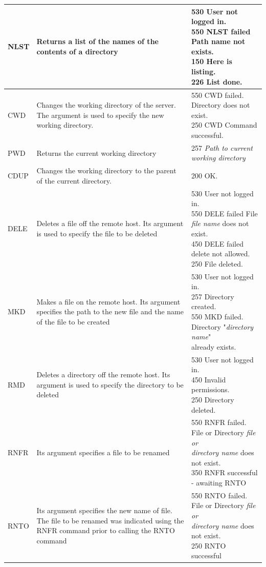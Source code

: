 \documentclass[10pt,twocolumn]{witseiepaper}
\begin{document}
\begin{appendix}
\begin{longtable}{|p{2cm}|p{7cm}|p{7cm}|}
	\hline 
NLST & Returns a list of the names of the contents of a directory & \makecell[l]{530 User not logged in. \\550 NLST failed Path name not exists. \\150 Here is listing. \\226 List done.} \\ 
	\hline 
CWD	& Changes the working directory of the server. The argument is used to specify the new working directory.  & \makecell[l]{550 CWD failed. Directory does not exist. \\250 CWD Command successful.} \\ 
	\hline 
PWD	& Returns the current working directory & 257 \textit{Path to current working directory} \\ 
	\hline 
CDUP	& Changes the working directory to the parent of the current directory. & 200 OK. \\ 
	\hline 
DELE	& Deletes a file off the remote host. Its argument is used to specify the file to be deleted & \makecell[l]{530 User not logged in. \\550 DELE failed File \textit{file name} does not exist. \\450 DELE failed delete not allowed. \\250 File deleted.} \\ 
	\hline 
MKD	& Makes a file on the remote host. Its argument specifies the path to the new file and the name of the file to be created & \makecell[l]{530 User not logged in. \\257 Directory created. \\550 MKD failed. Directory "\textit{directory name}" \\already exists.}\\ 
	\hline 
RMD	& Deletes a directory off the remote host. Its argument is used to specify the directory to be deleted & \makecell[l]{530 User not logged in. \\450 Invalid permissions. \\250 Directory deleted.}\\ 
	\hline 
RNFR	& Its argument specifies a file to be renamed & \makecell[l]{550 RNFR failed. File or Directory \textit{file or}\\ \textit{directory name} does not exist. \\350 RNFR successful - awaiting RNTO}\\ 
	\hline 
RNTO	& Its argument specifies the new name of file. The file to be renamed was indicated using the RNFR command prior to calling the RNTO command & \makecell[l]{550 RNTO failed. File or Directory \textit{file or}\\ \textit{directory name} does not exist. \\250 RNTO successful}\\ 

\end{longtable}
\end{appendix}
\end{document}
